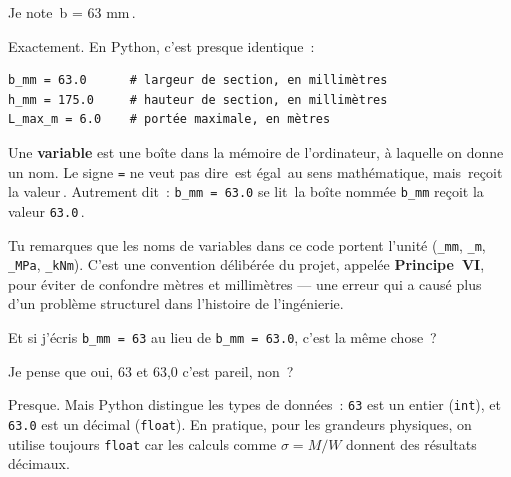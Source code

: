 \documentclass[12pt, a4paper, openany]{book}
\newcommand{\py}[1]{\texttt{#1}}
\begin{document}
\begin{apprenti}
Je note \guillemotleft\,b = 63 mm\,\guillemotright.
\end{apprenti}

\begin{maitre}
Exactement. En Python, c'est presque identique~:
\end{maitre}

\begin{lstlisting}[style=python, caption={D\'eclaration de variables en Python}]
b_mm = 63.0      # largeur de section, en millimètres
h_mm = 175.0     # hauteur de section, en millimètres
L_max_m = 6.0    # portée maximale, en mètres
\end{lstlisting}

\begin{definition}
Une \textbf{variable} est une bo\^ite dans la m\'emoire de l'ordinateur,
\`a laquelle on donne un nom. Le signe \py{=} ne veut pas dire
\guillemotleft\,est \'egal\,\guillemotright{} au sens math\'ematique,
mais \guillemotleft\,re\c{c}oit la valeur\,\guillemotright.
Autrement dit~: \py{b\_mm = 63.0} se lit
\guillemotleft\,la bo\^ite nomm\'ee \py{b\_mm} re\c{c}oit la valeur
\py{63.0}\,\guillemotright.
\end{definition}

Tu remarques que les noms de variables dans ce code portent l'unit\'e
(\py{\_mm}, \py{\_m}, \py{\_MPa}, \py{\_kNm}).
C'est une convention d\'elib\'er\'ee du projet, appel\'ee \textbf{Principe~VI},
pour \'eviter de confondre m\`etres et millim\`etres ---
une erreur qui a caus\'e plus d'un probl\`eme structurel dans l'histoire
de l'ing\'enierie.

\begin{maitre}
Et si j'\'ecris \py{b\_mm = 63} au lieu de \py{b\_mm = 63.0},
c'est la m\^eme chose~?
\end{maitre}

\begin{apprenti}
Je pense que oui, 63 et 63{,}0 c'est pareil, non~?
\end{apprenti}

\begin{maitre}
Presque. Mais Python distingue les types de donn\'ees~: \py{63} est un
entier (\py{int}), et \py{63.0} est un d\'ecimal (\py{float}).
En pratique, pour les grandeurs physiques, on utilise toujours \py{float}
car les calculs comme $\sigma = M / W$ donnent des r\'esultats d\'ecimaux.
\end{maitre}

\end{document}
